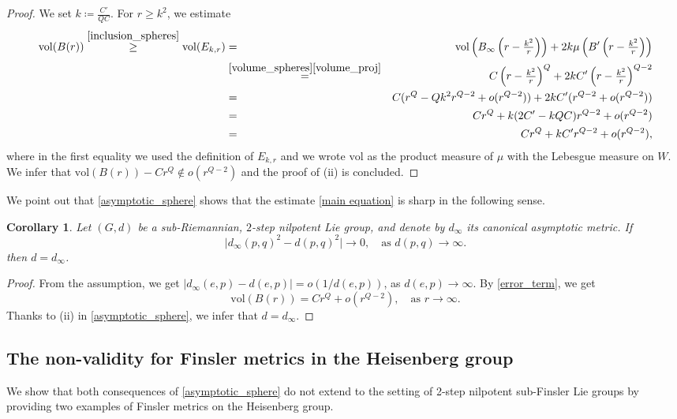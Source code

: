 \documentclass[a4paper,11pt,reqno]{amsart}
\theoremstyle{plain}
\newtheorem{corollary}[theorem]{Corollary}
\theoremstyle{definition}
\newcommand{\vol}{\mathrm{vol}}
\newcommand{\id}{e}
\newcommand{\coloneq}{\coloneqq}
\begin{document}
\begin{proof}
 We set $k \coloneq \frac{C'}{QC}$. For $r \ge k^2$, we estimate
 \begin{eqnarray*}
 \vol(B(r)) \stackrel{\eqref{inclusion_spheres}}{\ge} \vol(E_{k,r}) &=& \vol\left(B_\infty\left( r - \tfrac{k^2}{r}\right)\right) + 2k\mu\left(B'\left( r - \tfrac{k^2}{r}\right)\right) \\
 &\stackrel{\eqref{volume_spheres}\eqref{volume_proj}}{=}& C\left( r - \tfrac{k^2}{r}\right)^Q + 2kC'\left( r - \tfrac{k^2}{r}\right)^{Q-2} \\
 &=& C(r^Q - Qk^2 r^{Q-2} + o(r^{Q-2})) + 2kC'(r^{Q-2} + o(r^{Q-2})) \\
 &=& Cr^Q + k(2C' - kQC)r^{Q-2} + o(r^{Q-2}) \\
 &=& Cr^Q + kC'r^{Q-2} + o(r^{Q-2}),
 \end{eqnarray*}
 where in the first equality we used the definition of $E_{k,r}$ and we wrote $\vol$ as the product measure of $\mu$ with the Lebesgue measure on $W$. We infer that $\vol(B(r)) - Cr^Q \notin o(r^{Q-2})$ and the proof of (ii) is concluded.
 \end{proof}

We point out that \cref{asymptotic_sphere} shows that the estimate \eqref{main equation} is sharp in the following sense.

\begin{corollary} \label{sharpness}
 Let $(G,d)$ be a sub-Riemannian, $2$-step nilpotent Lie group, and denote by $d_\infty$ its canonical asymptotic metric. If
 \begin{equation*}
 \lvert d_\infty(p,q)^2 - d(p,q)^2 \rvert \to 0, \quad \text{as $d(p,q) \to \infty$.}
 \end{equation*}
 then $d=d_\infty$.
\end{corollary}

 \begin{proof} From the assumption, we get 
 $ \lvert d_\infty(\id,p) - d(\id,p) \rvert = o(1/d(\id,p)) $, as $d(\id,p)\to \infty$.
 By \cref{error_term},
we get
 \begin{equation*}
 \vol(B(r)) = C r^Q + o(r^{Q-2}), \quad \text{as $r\to \infty$.}
 \end{equation*}
 Thanks to (ii) in \cref{asymptotic_sphere}, we infer that $d=d_\infty$.
 \end{proof}

\subsection{The non-validity for Finsler metrics in the Heisenberg group}
 We show that both consequences of \cref{asymptotic_sphere} do not extend to the setting of 2-step nilpotent sub-Finsler Lie groups by providing two examples of Finsler metrics on the Heisenberg group.
 
\end{document}
